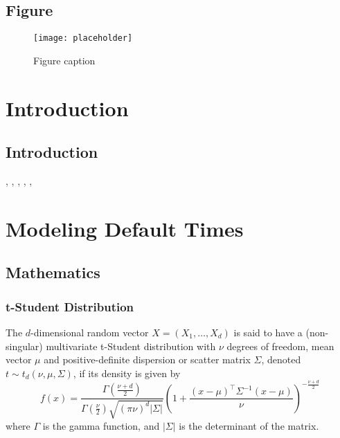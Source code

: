 \documentclass[11pt,fleqn]{book} %
\begin{document}

\section{Figure}

\begin{figure}[h]
\centering\texttt{[image: placeholder]}
\caption{Figure caption}
\end{figure}


\chapter{Introduction}
\section{Introduction}
\cite{mcneil:2005}, \cite{sklar:1959}, \cite{li:2000}, 
\cite{roncalli:2001}, \cite{embrechts:2002}, \cite{cmetrics:1997}

\chapter{Modeling Default Times}

\section{Mathematics}

\subsection{t-Student Distribution}

\begin{definition}
The $d$-dimensional random vector $X=(X_1,\dots,X_d)$ is said to have a 
(non-singular) multivariate t-Student distribution with $\nu$ degrees of freedom, 
mean vector $\mu$ and positive-definite dispersion or scatter matrix $\Sigma$, 
denoted $t \sim t_d(\nu,\mu,\Sigma)$, if its density is given by
\begin{displaymath}
f(x)=\frac{\Gamma\left(\frac{\nu+d}{2}\right)}{\Gamma\left(\frac{\nu}{2}\right)\sqrt{(\pi \nu)^d |\Sigma|}}
\left(
1+ \frac{(x-\mu)^\top\Sigma^{-1}(x-\mu)}{\nu}
\right)^{-\frac{\nu+d}{2}}
\end{displaymath}
\noindent where $\Gamma$ is the gamma function, and $|\Sigma|$ is the 
determinant of the matrix.
\end{definition}
\end{document}
